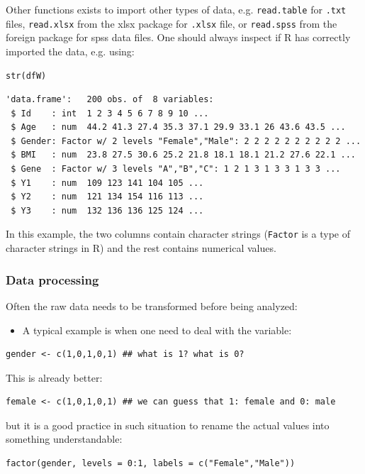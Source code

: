 \documentclass[12pt]{article}
\begin{document}
Other functions exists to import other types of data,
e.g. \texttt{read.table} for \texttt{.txt} files, \texttt{read.xlsx} from the xlsx package
for \texttt{.xlsx} file, or \texttt{read.spss} from the foreign package for spss
data files. One should always inspect if R has correctly imported the
data, e.g. using:
\lstset{language=r,label= ,caption= ,captionpos=b,numbers=none}
\begin{lstlisting}
str(dfW)
\end{lstlisting}

\begin{verbatim}
'data.frame':	200 obs. of  8 variables:
 $ Id    : int  1 2 3 4 5 6 7 8 9 10 ...
 $ Age   : num  44.2 41.3 27.4 35.3 37.1 29.9 33.1 26 43.6 43.5 ...
 $ Gender: Factor w/ 2 levels "Female","Male": 2 2 2 2 2 2 2 2 2 2 ...
 $ BMI   : num  23.8 27.5 30.6 25.2 21.8 18.1 18.1 21.2 27.6 22.1 ...
 $ Gene  : Factor w/ 3 levels "A","B","C": 1 2 1 3 1 3 3 1 3 3 ...
 $ Y1    : num  109 123 141 104 105 ...
 $ Y2    : num  121 134 154 116 113 ...
 $ Y3    : num  132 136 136 125 124 ...
\end{verbatim}

In this example, the two columns contain character strings (\texttt{Factor}
is a type of character strings in R) and the rest contains numerical
values.

\subsubsection{Data processing}
\label{sec:org0d6d058}

Often the raw data needs to be transformed before being analyzed:
\begin{itemize}
\item A typical example is when one need to deal with the variable:
\end{itemize}
\lstset{language=r,label= ,caption= ,captionpos=b,numbers=none}
\begin{lstlisting}
gender <- c(1,0,1,0,1) ## what is 1? what is 0?
\end{lstlisting}

This is already better:
\lstset{language=r,label= ,caption= ,captionpos=b,numbers=none}
\begin{lstlisting}
female <- c(1,0,1,0,1) ## we can guess that 1: female and 0: male
\end{lstlisting}

but it is a good practice in such situation to rename the actual
values into something understandable:
\lstset{language=r,label= ,caption= ,captionpos=b,numbers=none}
\begin{lstlisting}
factor(gender, levels = 0:1, labels = c("Female","Male"))
\end{lstlisting}
\end{document}
